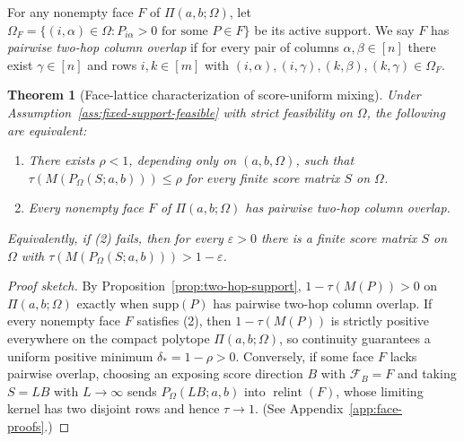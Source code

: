 \documentclass[10pt]{article}
\newtheorem{theorem}{Theorem}
\newcommand{\supp}{\mathrm{supp}}
\begin{document}
For any nonempty face $F$ of $\Pi(a,b;\Omega)$, let $\Omega_F = \{(i,\alpha)\in\Omega : P_{i\alpha} > 0 \text{ for some } P \in F\}$ be its active support. We say $F$ has \emph{pairwise two-hop column overlap} if for every pair of columns $\alpha,\beta \in [n]$ there exist $\gamma \in [n]$ and rows $i,k \in [m]$ with $(i,\alpha), (i,\gamma), (k,\beta), (k,\gamma) \in \Omega_F$.

\begin{theorem}[Face-lattice characterization of score-uniform mixing]
\label{thm:face-lattice-dichotomy}
Under Assumption~\ref{ass:fixed-support-feasible} with strict feasibility on $\Omega$, the following are equivalent:
\begin{enumerate}[leftmargin=1.5em]
  \item There exists $\rho < 1$, depending only on $(a,b,\Omega)$, such that $\tau(M(P_\Omega(S;a,b))) \le \rho$ for every finite score matrix $S$ on $\Omega$.
  \item Every nonempty face $F$ of $\Pi(a,b;\Omega)$ has pairwise two-hop column overlap.
\end{enumerate}
Equivalently, if (2) fails, then for every $\varepsilon > 0$ there is a finite score matrix $S$ on $\Omega$ with $\tau(M(P_\Omega(S;a,b))) > 1 - \varepsilon$.
\end{theorem}

\begin{proof}[Proof sketch]
By Proposition~\ref{prop:two-hop-support}, $1 - \tau(M(P)) > 0$ on $\Pi(a,b;\Omega)$ exactly when $\supp(P)$ has pairwise two-hop column overlap. If every nonempty face $F$ satisfies (2), then $1 - \tau(M(P))$ is strictly positive everywhere on the compact polytope $\Pi(a,b;\Omega)$, so continuity guarantees a uniform positive minimum $\delta_* = 1 - \rho > 0$. Conversely, if some face $F$ lacks pairwise overlap, choosing an exposing score direction $B$ with $\mathcal{F}_B = F$ and taking $S = LB$ with $L \to \infty$ sends $P_\Omega(LB;a,b)$ into $\operatorname{relint}(F)$, whose limiting kernel has two disjoint rows and hence $\tau \to 1$. (See Appendix~\ref{app:face-proofs}.)
\end{proof}
\end{document}
